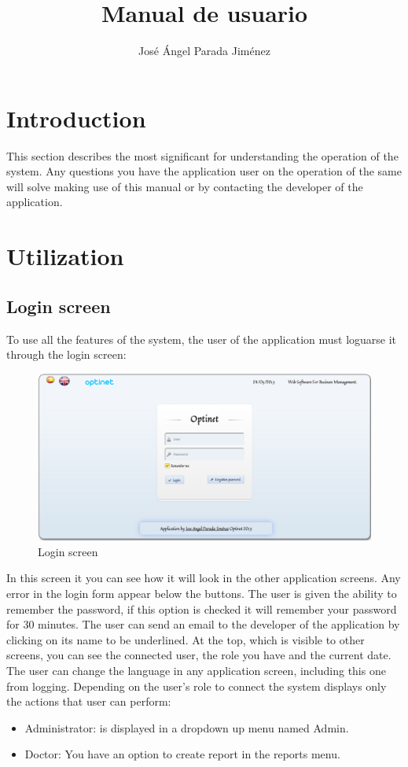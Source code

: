 \documentclass[a4paper,11pt]{book}
\title{Manual de usuario}
\author{José Ángel Parada Jiménez}
\begin{document}
\section{Introduction}
This section describes the most significant for understanding the operation of the system. Any questions you have the application user on the operation of the same will solve making use of this manual or by contacting the developer of the application.

\section{Utilization}

\subsection {Login screen}
To use all the features of the system, the user of the application must loguarse it through the login screen:

\begin{figure}[!htb]
  \centering
    \includegraphics[scale=0.35]{icaplogin.png}
  \caption{Login screen}
  \label{a}
\end{figure}

In this screen it you can see how it will look in the other application screens. Any error in the login form appear below the buttons. The user is given the ability to remember the password, if this option is checked it will remember your password for 30 minutes. The user can send an email to the developer of the application by clicking on its name to be underlined. At the top, which is visible to other screens, you can see the connected user, the role you have and the current date. The user can change the language in any application screen, including this one from logging. Depending on the user's role to connect the system displays only the actions that user can perform:
\begin{itemize}
\item Administrator: is displayed in a dropdown up menu named Admin.
\item Doctor: You have an option to create report in the reports menu.
\end{itemize}
\end{document}
